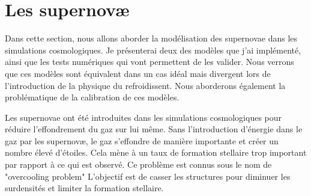 \clearpage
\section{Les supernovæ}

Dans cette section, nous allons aborder la modélisation des supernovae dans les simulations cosmologiques.
Je présenterai deux des modèles que j'ai implémenté, ainsi que les tests numériques qui vont permettent de les valider.
Nous verrons que ces modèles sont équivalent dans un cas idéal mais divergent lors de l'introduction de la physique du refroidissent.
Nous aborderons également la problématique de la calibration de ces modèles.


Les supernovae ont été introduites dans les simulations cosmologiques pour réduire l'effondrement du gaz sur lui même.
Sans l'introduction d'énergie dans le gaz par les supernovæ, le gaz s'effondre de manière importante et créer un nombre élevé d'étoiles.
Cela mène à un taux de formation stellaire trop important par rapport à ce qui est observé.
Ce problème est connus sous le nom de "overcooling problem"
L'objectif est de casser les structures pour diminuer les surdensités et limiter la formation stellaire.


%
%


